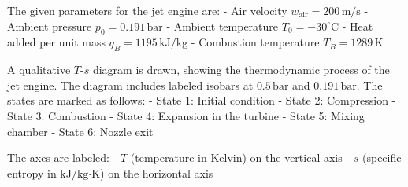 The given parameters for the jet engine are:  
- Air velocity \( w_{\text{air}} = 200 \, \text{m/s} \)  
- Ambient pressure \( p_0 = 0.191 \, \text{bar} \)  
- Ambient temperature \( T_0 = -30^\circ\text{C} \)  
- Heat added per unit mass \( q_B = 1195 \, \text{kJ/kg} \)  
- Combustion temperature \( T_B = 1289 \, \text{K} \)  

A qualitative \( T \)-\( s \) diagram is drawn, showing the thermodynamic process of the jet engine. The diagram includes labeled isobars at \( 0.5 \, \text{bar} \) and \( 0.191 \, \text{bar} \). The states are marked as follows:  
- State 1: Initial condition  
- State 2: Compression  
- State 3: Combustion  
- State 4: Expansion in the turbine  
- State 5: Mixing chamber  
- State 6: Nozzle exit  

The axes are labeled:  
- \( T \) (temperature in Kelvin) on the vertical axis  
- \( s \) (specific entropy in \( \text{kJ}/\text{kg·K} \)) on the horizontal axis